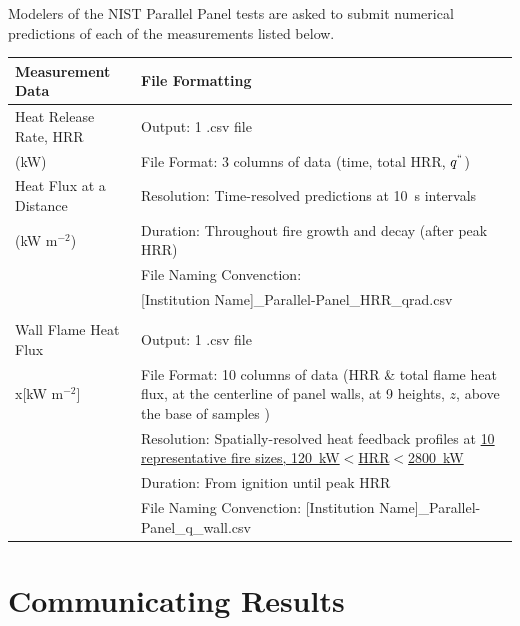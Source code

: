 \documentclass[12pt]{article}
\begin{document}
Modelers of the NIST Parallel Panel tests are asked to submit numerical predictions of each of the measurements listed below.
\begin{table}[htb]
\begin{tabular}{p{0.25\linewidth} | p{0.75\linewidth}}
\hline
\textbf{Measurement Data}       	& \textbf{File Formatting } \\
\hline
Heat Release Rate, HRR 	& Output: 1 .csv file\\
(kW)& File Format: 3 columns of data (time, total HRR, $q^{``}$)\\
Heat Flux at a Distance	& Resolution: Time-resolved predictions at 10~s intervals \\
(kW m$^{-2}$)	& Duration: Throughout fire growth and decay (after peak HRR) \\
	& File Naming Convenction: \\
	& [Institution Name]\_Parallel-Panel\_HRR\_qrad.csv \\
&	\\
Wall Flame Heat Flux & Output: 1 .csv file\\
x[kW m$^{-2}$]& File Format: 10 columns of data (HRR \& total flame heat flux, at the centerline of panel walls, at 9 heights, $z$, above the base of samples )\\
	& Resolution: Spatially-resolved heat feedback profiles at \href{https://github.com/MaCFP/macfp-db/blob/master/Fire_Growth/NIST_Parallel_Panel/Experimental_Data/PMMA_heatflux.csv}{10 representative fire sizes, 120~kW$<$HRR$<$2800~kW}\\
	& Duration: From ignition until peak HRR \\
	& File Naming Convenction: [Institution Name]\_Parallel-Panel\_q\_wall.csv \\
\hline
\end{tabular}
\end{table}


\clearpage
\section{Communicating Results}
\label{Sec:Com-Results}
\end{document}
